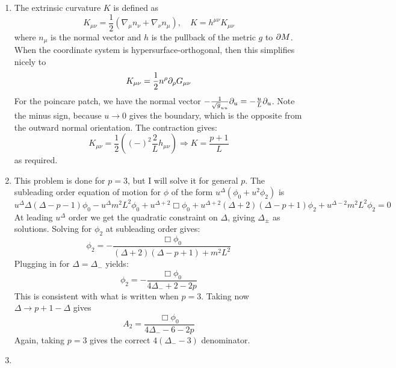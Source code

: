 \documentclass[11pt, class=article, crop=false]{standalone}
\begin{document}
\begin{enumerate}
	\item The extrinsic curvature $K$ is defined as
	\[
		K_{\mu \nu} = \frac12 (\nabla_\mu n_\nu + \nabla_\nu n_\mu), \quad K = h^{\mu \nu} K_{\mu \nu}
	\]
	where $n_\mu$ is the normal vector and $h$ is the pullback of the metric $g$ to $\partial M$. When the coordinate system is hypersurface-orthogonal, then this simplifies nicely to 
	\[
		K_{\mu \nu} = \frac12 n^\rho \partial_\rho G_{\mu \nu}
	\]
	For the poincare patch, we have the normal vector $-\frac{1}{\sqrt g_{uu} }\partial_u = -\frac{u}{L} \partial_u$. Note the minus sign, because $u \to 0$ gives the boundary, which is the opposite from the outward normal orientation. The contraction gives:
	\[
		K_{\mu \nu} = \frac12 ((-)^2 \frac{2}{L} h_{\mu \nu}) \Rightarrow K = \frac{p+1}{L}
	\]
	as required.
	
	\item This problem is done for $p=3$, but I will solve it for general $p$. The subleading order equation of motion for $\phi$ of the form $u^{\Delta} (\phi_0 + u^2 \phi_2)$ is
	\[
		u^\Delta \Delta (\Delta -p-1) \phi_0 -  u^{\Delta} m^2 L^2 \phi_0 + u^{\Delta + 2} \Box \phi_0  + u^{\Delta + 2} (\Delta+2) (\Delta - p + 1)  \phi_2 + u^{\Delta - 2} m^2 L^2 \phi_2 = 0
	\]
	At leading $u^{\Delta}$ order we get the quadratic constraint on $\Delta$, giving $\Delta_\pm$ as solutions. Solving for $\phi_2$ at subleading order gives:
	\[
		\phi_2 = - \frac{\Box \phi_0}{(\Delta+2)(\Delta-p+1) + m^2 L^2}
	\]
	Plugging in for $\Delta = \Delta_-$ yields:
	\[
		\phi_2 = - \frac{\Box \phi_0}{4 \Delta_- + 2 - 2p}
	\]
	This is consistent with what is written when $p=3$. Taking now $\Delta \to p+1 - \Delta$ gives
	\[
		A_2 = \frac{\Box \phi_0}{4 \Delta_- - 6 - 2 p}
	\]
	Again, taking $p = 3$ gives the correct $4 (\Delta_- - 3)$ denominator.
	
	\item 
	
\end{enumerate}

\end{document}
